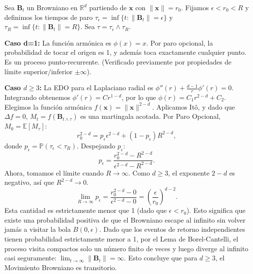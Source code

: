 \documentclass[11pt, letterpaper]{article}
\begin{document}
\begin{solucion}
    Sea $\mathbf{B}_t$ un Browniano en $\mathbb{R}^d$ partiendo de $\mathbf{x}$ con $\|\mathbf{x}\| = r_0$. Fijamos $\epsilon < r_0 < R$ y definimos los tiempos de paro $\tau_\epsilon = \inf\{t : \|\mathbf{B}_t\| = \epsilon\}$ y $\tau_R = \inf\{t : \|\mathbf{B}_t\| = R\}$. Sea $\tau = \tau_\epsilon \wedge \tau_R$.

    \textbf{Caso d=1:} La función armónica es $\phi(x) = x$. Por paro opcional, la probabilidad de tocar el origen es 1, y además toca exactamente cualquier punto. Es un proceso punto-recurrente. (Verificado previamente por propiedades de límite superior/inferior $\pm \infty$).

    \textbf{Caso $d \ge 3$:} La EDO para el Laplaciano radial es $\phi''(r) + \frac{d-1}{r}\phi'(r) = 0$.
    Integrando obtenemos $\phi'(r) = C r^{1-d}$, por lo que $\phi(r) = C_1 r^{2-d} + C_2$.
    Elegimos la función armónica $f(\mathbf{x}) = \|\mathbf{x}\|^{2-d}$.
    Aplicamos Itô, y dado que $\Delta f = 0$, $M_t = f(\mathbf{B}_{t \wedge \tau})$ es una martingala acotada.
    Por Paro Opcional, $M_0 = \mathbb{E}[M_\tau]$:
    \[ r_0^{2-d} = p_\epsilon \epsilon^{2-d} + (1-p_\epsilon) R^{2-d}, \]
    donde $p_\epsilon = \mathbb{P}(\tau_\epsilon < \tau_R)$.
    Despejando $p_\epsilon$:
    \[ p_\epsilon = \frac{r_0^{2-d} - R^{2-d}}{\epsilon^{2-d} - R^{2-d}}. \]
    Ahora, tomamos el límite cuando $R \to \infty$. Como $d \ge 3$, el exponente $2-d$ es negativo, así que $R^{2-d} \to 0$.
    \[ \lim_{R \to \infty} p_\epsilon = \frac{r_0^{2-d} - 0}{\epsilon^{2-d} - 0} = \left( \frac{\epsilon}{r_0} \right)^{d-2}. \]
    Esta cantidad es estrictamente menor que 1 (dado que $\epsilon < r_0$). Esto significa que existe una probabilidad positiva de que el Browniano escape al infinito sin volver jamás a visitar la bola $B(0, \epsilon)$.
    Dado que los eventos de retorno independientes tienen probabilidad estrictamente menor a 1, por el Lema de Borel-Cantelli, el proceso visita compactos solo un número finito de veces y luego diverge al infinito casi seguramente: $\lim_{t \to \infty} \|\mathbf{B}_t\| = \infty$.
    Esto concluye que para $d \ge 3$, el Movimiento Browniano es transitorio.
\end{solucion}

\newpage
\end{document}
